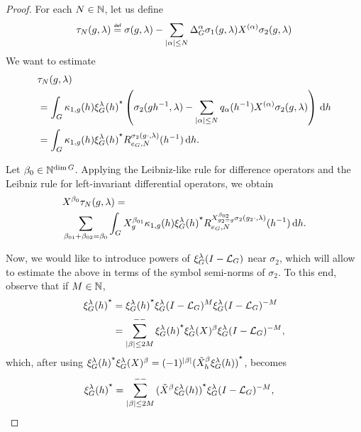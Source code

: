 \begin{proof}
    For each $N \in \mathbb{N}$,
    let us define
    \begin{align*}
        \tau_N(g, \lambda) \defeq
        \sigma(g, \lambda) - \sum_{\abs \alpha \leq N} \DifferenceOperatorOrder \alpha \sigma_1(g, \lambda) \TaylorLeftDifferentialOperator \alpha \sigma_2(g, \lambda)
    \end{align*}
    We want to estimate
    \begin{align}
        &\tau_N(g, \lambda) \notag\\
        &= \int_G \kappa_{1, g}(h) {\xi^{\lambda}_{G}(h)}^\star
        \left(\sigma_2(g h^{-1}, \lambda) - \sum_{\left|{\alpha}\right| \leq N} q_\alpha(h^{-1}) X^{(\alpha)} \sigma_2(g, \lambda)\right) \,\mathrm{d} h \notag\\
        &= \int_G \kappa_{1, g}(h) {\xi^{\lambda}_{G}(h)}^\star R^{\sigma_2(g \cdot, \lambda)}_{e_G, N} (h^{-1}) \,\mathrm{d} h.
        \label{eq:remainder_of_composition_formula}
    \end{align}

    Let $\beta_0 \in \mathbb{N}^{\dim G}$.
    Applying the Leibniz-like rule for difference operators
    and the Leibniz rule for left-invariant differential operators,
    we obtain
    \begin{align*}
        &\LeftDifferentialOperator {\beta_0} \tau_N(g, \lambda) =\\
        &\sum_{%
                \beta_{01} + \beta_{02} = \beta_0
        }
        \int_\Group \LeftDifferentialOperator [g] {\beta_{01}} \kappa_{1, g}(h) \adj{\Rep \lambda(h)}
        \TaylorRemainder {\LeftDifferentialOperator [g_2 = g] {\beta_{02}} \sigma_2(g_2 \dummy, \lambda)} {e_\Group} N (h^{-1}) \dd h.
    \end{align*}

    Now, we would like to introduce powers of $\xi^{\lambda}_{G} (I - {\mathcal{L}_{G}})^{}$ near $\sigma_2$,
    which will allow to estimate the above in terms of the symbol semi-norms of $\sigma_2$.
    To this end,
    observe that if $M \in \mathbb{N}$,
    \begin{align*}
        {\xi^{\lambda}_{G}(h)}^\star
        &= {\xi^{\lambda}_{G}(h)}^\star \xi^{\lambda}_{G} (I - {\mathcal{L}_{G}})^{M} \xi^{\lambda}_{G} (I - {\mathcal{L}_{G}})^{-M}\\
        &= \sum_{\left|{\beta}\right| \leq 2 M}^{--} {\xi^{\lambda}_{G}(h)}^\star \xi^{\lambda}_{G}(X)^\beta \xi^{\lambda}_{G} (I - {\mathcal{L}_{G}})^{-M},
    \end{align*}
    which, after using $\adj {\Rep \lambda(h)} \Rep \lambda (X)^\beta = (-1)^{\abs \beta} \adj {(\RightDifferentialOperator[h] \beta \Rep \lambda (h))}$, becomes
    \begin{align*}
        \adj{\Rep \lambda(h)}
        &=
        \lcsum{\abs \beta \leq 2 M}
        \adj{(\RightDifferentialOperator \beta \Rep \lambda(h))} \Rep \lambda \BesselPotentialSquared {-M},
    \end{align*}


\end{proof}

